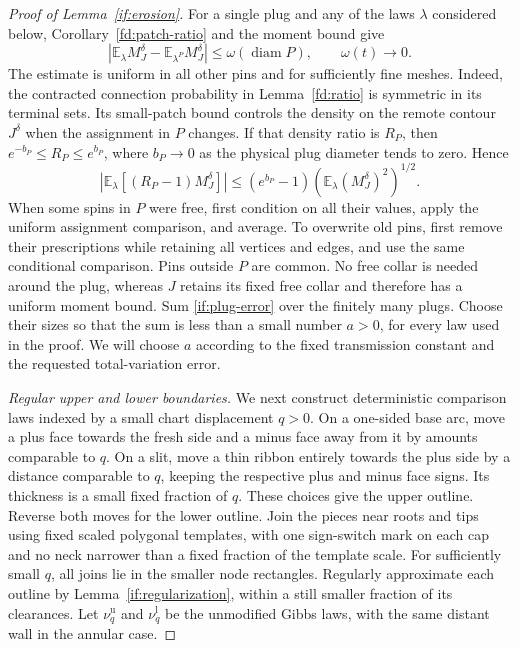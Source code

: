 \documentclass[11pt]{article}
\theoremstyle{definition}
\theoremstyle{remark}
\numberwithin{equation}{section}
\begin{document}
\begin{proof}[Proof of Lemma~\ref{if:erosion}]
For a single plug and any of the laws $\lambda$ considered below,
Corollary~\ref{fd:patch-ratio} and the moment bound give
\begin{equation}\label{if:plug-error}
       |\mathbb E_{\lambda}M_J^\delta
               -\mathbb E_{\lambda^P}M_J^\delta|
           \le \omega(\operatorname{diam}P),\qquad \omega(t)\longrightarrow0.
\end{equation}
The estimate is uniform in all other pins and for sufficiently fine
meshes. Indeed, the contracted connection probability in
Lemma~\ref{fd:ratio} is symmetric in its terminal sets. Its small-patch
bound controls the density on the remote contour $J^\delta$ when
the assignment in $P$ changes. If that density ratio is $R_P$, then
$e^{-b_P}\le R_P\le e^{b_P}$, where $b_P\to0$ as the physical plug
diameter tends to zero. Hence
\[
 \left|\mathbb E_{\lambda}[(R_P-1)M_J^\delta]\right|
 \le (e^{b_P}-1)
             \left(\mathbb E_{\lambda}(M_J^\delta)^2\right)^{1/2}.
\]
When some spins in $P$ were free, first condition on all their values,
apply the uniform assignment comparison, and average. To overwrite
old pins, first remove their prescriptions while retaining all vertices
and edges, and use the same conditional comparison. Pins outside $P$
are common. No free collar is needed around the plug, whereas $J$
retains its fixed free collar and therefore has a uniform moment bound.
Sum \eqref{if:plug-error} over the finitely many plugs. Choose their
sizes so that the sum is less than a small number $a>0$, for every
law used in the proof. We will choose $a$ according to the fixed
transmission constant and the requested total-variation error.

\emph{Regular upper and lower boundaries.}
We next construct deterministic comparison laws indexed by a small
chart displacement $q>0$. On a one-sided base arc, move a plus face
towards the fresh side and a minus face away from it by amounts
comparable to $q$. On a slit, move a thin ribbon entirely towards
the plus side by a distance comparable to $q$, keeping the respective
plus and minus face signs. Its thickness is a small fixed fraction
of $q$. These choices give the upper outline. Reverse both moves
for the lower outline. Join the pieces near roots and tips using
fixed scaled polygonal templates, with one sign-switch mark on
each cap and no neck narrower than a fixed fraction of the template
scale. For sufficiently small $q$, all joins lie in the smaller node
rectangles. Regularly approximate each outline by
Lemma~\ref{if:regularization}, within a still smaller fraction of its
clearances. Let $\nu_q^{\mathrm u}$ and $\nu_q^{\mathrm l}$ be the
unmodified Gibbs laws, with the same distant wall in the annular case.


\end{proof}
\end{document}
